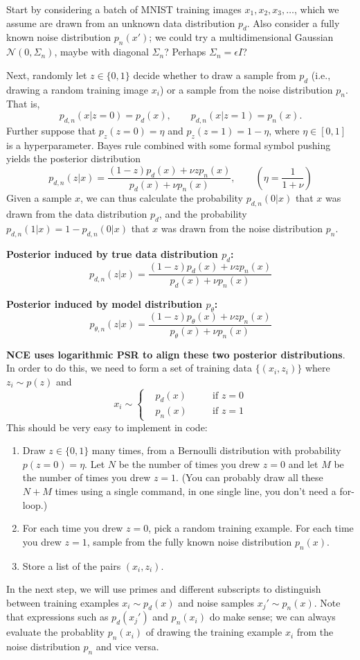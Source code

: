 \documentclass[a4paper]{article}
\begin{document}
Start  by considering a batch of MNIST training images $x_1,x_2,x_3,\ldots$, which we assume are drawn from an unknown data distribution $p_d$. Also consider a fully known noise distribution $p_n(x')$; we could try a multidimensional Gaussian $\mathcal{N}(0,\Sigma_n)$, maybe with diagonal $\Sigma_n$? Perhaps $\Sigma_n = \epsilon I$?

Next, randomly let $z \in \{0,1\}$ decide whether to draw a sample from $p_d$ (i.e., drawing a random training image $x_i$) or a sample from the noise distribution $p_n$. That is,
$$p_{d,n}(x|z=0) = p_d(x), \qquad p_{d,n}(x|z=1) =p_n(x).$$
Further suppose that $p_z(z=0) = \eta$ and $p_z(z=1) = 1-\eta$, where $\eta \in [0,1]$ is a hyperparameter. Bayes rule combined with some formal symbol pushing yields the posterior distribution
$$\boxed{p_{d,n}(z|x) = \frac{(1-z)p_d(x) + \nu z p_n(x)}{p_d(x) + \nu p_n(x)}, \qquad \left(\eta = \frac{1}{1+\nu}\right)}$$
Given a sample $x$, we can thus calculate the probability $p_{d,n}(0|x)$ that $x$ was drawn from the data distribution $p_d$, and the probability $p_{d,n}(1|x) = 1 - p_{d,n}(0|x)$ that $x$ was drawn from the noise distribution $p_n$.

\textbf{Posterior induced by true data distribution $p_d$:}
$$p_{d,n}(z|x) = \frac{(1-z)p_d(x) + \nu z p_n(x)}{p_d(x) + \nu p_n(x)}$$

\textbf{Posterior induced by model distribution $p_\theta$:}
$$p_{\theta,n}(z|x) = \frac{(1-z)p_\theta(x) + \nu z p_n(x)}{p_\theta(x) + \nu p_n(x)}$$

\textbf{NCE uses logarithmic PSR to align these two posterior distributions}. In order to do this, we need to form a set of training data $\{(x_i,z_i)\}$ where $z_i \sim p(z)$ and
$$x_i \sim \left\{ \begin{aligned} &p_d(x) \quad &&\text{if } z = 0\\ &p_n(x) \quad &&\text{if } z = 1\end{aligned}\right.$$
This should be very easy to implement in code:
\begin{enumerate}
\item Draw $z \in \{0,1\}$ many times, from a Bernoulli distribution with probability $p(z=0) = \eta$. Let $N$ be the number of times you drew $z = 0$ and let $M$ be the number of times you drew $z = 1$. (You can probably draw all these $N+M$ times using a single command, in one single line, you don't need a for-loop.)

\item For each time you drew $z = 0$, pick a random training example. For each time you drew $z = 1$, sample from the fully known noise distribution $p_n(x)$.

\item Store a list of the pairs $(x_i,z_i)$.
\end{enumerate}
In the next step, we will use primes and different subscripts to distinguish between training examples $x_i \sim p_d(x)$ and noise samples $x_j' \sim p_n(x)$. Note that expressions such as $p_d(x_j')$ and $p_n(x_i)$ do make sense; we can always evaluate the probablity $p_n(x_i)$ of drawing the training example $x_i$ from the noise distribution $p_n$ and vice versa.
\end{document}
